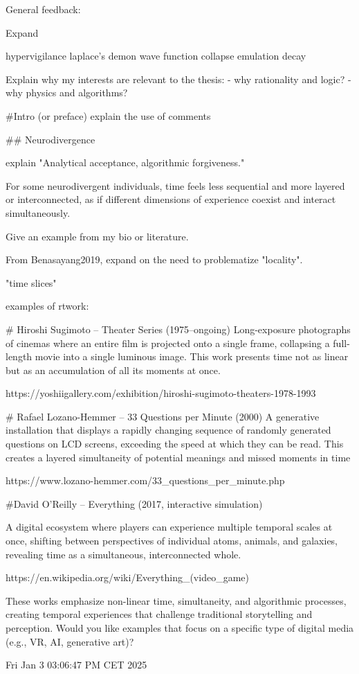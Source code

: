 

General feedback: 

Expand 

hypervigilance
laplace's demon
wave function collapse
emulation
decay

Explain why my interests are relevant to the thesis:  
 - why rationality and logic?
 - why physics and algorithms? 

 
 #Intro (or preface)
 explain the use of comments 


 

## Neurodivergence

explain  "Analytical acceptance, algorithmic forgiveness." 


For some neurodivergent individuals, time feels less
sequential and more layered or interconnected, as if different
dimensions of experience coexist and interact simultaneously.

Give an example from my bio or literature. 

From Benasayang2019, expand on the need to problematize "locality". 


"time slices"

examples of rtwork: 

# Hiroshi Sugimoto – Theater Series (1975–ongoing)
Long-exposure photographs of cinemas where an entire film is projected onto a single frame, collapsing a full-length movie into a single luminous image. This work presents time not as linear but as an accumulation of all its moments at once.

https://yoshiigallery.com/exhibition/hiroshi-sugimoto-theaters-1978-1993


# Rafael Lozano-Hemmer – 33 Questions per Minute (2000)
A generative installation that displays a rapidly changing sequence of randomly generated questions on LCD screens, exceeding the speed at which they can be read. This creates a layered simultaneity of potential meanings and missed moments in time

https://www.lozano-hemmer.com/33_questions_per_minute.php



#David O’Reilly – Everything (2017, interactive simulation)

A digital ecosystem where players can experience multiple temporal scales at once, shifting between perspectives of individual atoms, animals, and galaxies, revealing time as a simultaneous, interconnected whole.

https://en.wikipedia.org/wiki/Everything_(video_game)

These works emphasize non-linear time, simultaneity, and algorithmic processes, creating temporal experiences that challenge traditional storytelling and perception. Would you like examples that focus on a specific type of digital media (e.g., VR, AI, generative art)?


Fri Jan  3 03:06:47 PM CET 2025
